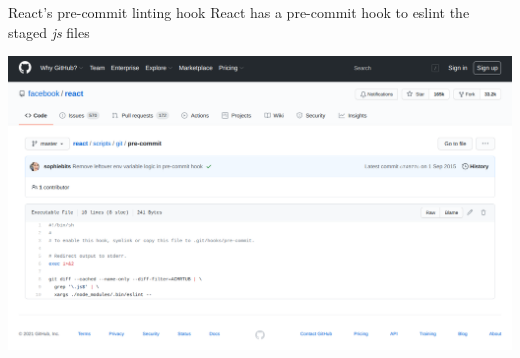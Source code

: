 \documentclass[11pt]{beamer}
\begin{document}
\begin{frame}{React's pre-commit linting hook}
  React has a pre-commit hook to eslint the staged \textit{js} files
  \begin{center}
   \href{https://github.com/facebook/react/blob/master/scripts/git/pre-commit}{
      \includegraphics[scale=0.2]{react-pre-commit.png}
   }
  \end{center}
\end{frame}
\end{document}
